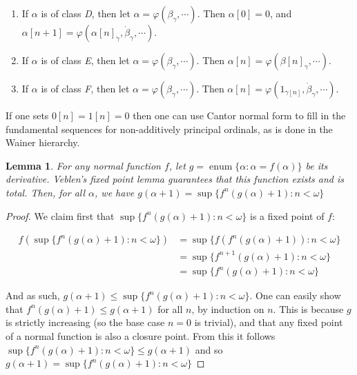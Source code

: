 \documentclass{article}
\theoremstyle{definition}
\theoremstyle{plain}
\theoremstyle{plain}
\theoremstyle{plain}
\theoremstyle{plain}
\theoremstyle{remark}
\theoremstyle{remark}
\theoremstyle{remark}
\theoremstyle{plain}
\newtheorem{lemma}[definition]{Lemma}
\theoremstyle{plain}
\begin{document}
\begin{enumerate}
\begin{enumerate}
    \end{enumerate}
    \item If $\alpha$ is of class \textit{D}, then let $\alpha = \varphi(\beta_\gamma, \cdots)$. Then $\alpha[0] = 0$, and $\alpha[n+1] = \varphi(\alpha[n]_{\dot{\gamma}}, \dot{\beta}_\gamma, \cdots)$.
    \item If $\alpha$ is of class \textit{E}, then let $\alpha = \varphi(\beta_\gamma, \cdots)$. Then $\alpha[n] = \varphi(\beta[n]_\gamma, \cdots)$.
    \item If $\alpha$ is of class \textit{F}, then let $\alpha = \varphi(\beta_\gamma, \cdots)$. Then $\alpha[n] = \varphi(1_{\gamma[n]}, \dot{\beta}_\gamma, \cdots)$.
\end{enumerate}

If one sets $0[n] = 1[n] = 0$ then one can use Cantor normal form to fill in the fundamental sequences for non-additively principal ordinals, as is done in the Wainer hierarchy.

\begin{lemma}
For any normal function $f$, let $g = \operatorname{enum}\{\alpha: \alpha = f(\alpha)\}$ be its derivative. Veblen's fixed point lemma guarantees that this function exists and is total. Then, for all $\alpha$, we have $g(\alpha+1) = \sup\{f^n(g(\alpha)+1): n < \omega\}$
\end{lemma}

\begin{proof}
We claim first that $\sup\{f^n(g(\alpha)+1): n < \omega\}$ is a fixed point of $f$:

\begin{equation}
\begin{split}
f(\sup\{f^n(g(\alpha)+1): n < \omega\}) & = \sup\{f(f^n(g(\alpha)+1)): n < \omega\} \\ & = \sup\{f^{n+1}(g(\alpha)+1): n < \omega\} \\ & = \sup\{f^n(g(\alpha)+1): n < \omega\}
\end{split}
\end{equation}

And as such, $g(\alpha+1) \leq \sup\{f^n(g(\alpha)+1): n < \omega\}$. One can easily show that $f^n(g(\alpha)+1) \leq g(\alpha+1)$ for all $n$, by induction on $n$. This is because $g$ is strictly increasing (so the base case $n = 0$ is trivial), and that any fixed point of a normal function is also a closure point. From this it follows $\sup\{f^n(g(\alpha)+1): n < \omega\} \leq g(\alpha+1)$ and so $g(\alpha+1) = \sup\{f^n(g(\alpha)+1): n < \omega\}$
\end{proof}
\end{document}
